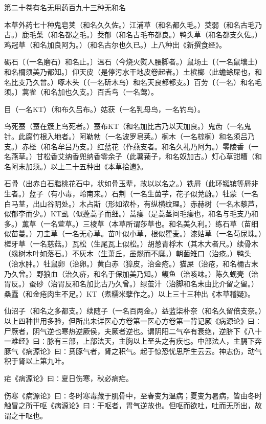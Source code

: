 \documentclass[a4paper,12pt,UTF8,twoside]{ctexbook}
\begin{document}
第二十卷有名无用药百九十三种无和名

本草外药七十种鬼皂荚（和名久久佐。）江浦草（和名都久毛。）茭弱（和名古毛乃古。）鹿毛菜（和名都之毛。）茭郁（和名古毛布都良。）鸭头草（和名都支久佐。）鸡冠草（和名加良阿为。）（和名古尔也久已。）上八种出《新撰食经》。

砺石〔（一名磨石）和名止。〕温石（今烧火熨人腰脚者。）鼠场土〔（一名鼠壤土）和名檷须美乃都知。〕仰天皮（是停污水干地皮卷起者。）土槟榔（此蟾蜍屎也，和名比支乃久曾。）啄木头〔（一名斫木鸟）和名天良都都支。〕百劳〔（一名）和名毛须。〕蒿雀（和名加也久支。）百舌鸟（一名莺）。

目（一名KT）（和布久吕布。）姑获（一名乳母鸟，一名钓鸟）。

鸟死蚕（蚕在簇上鸟死者。）蚕布KT（和名加比古乃以天加良。）鬼齿（一名鬼针。此腐竹根入地者。）阿勒勃（一名波罗皂荚。）榈木（一名棕榈）和名须吕乃支。）赤柽（和名牟吕乃支。）红蓝花（作燕支者。和名久礼乃阿为。）零陵香（一名燕草。）甘松香艾纳香兜纳香零余子（此薯蓣子，和名奴加古。）灯心草甜糟（和名阿末加须。）以上二十五种出《本草拾遗》。

石骨（出赤白石脂桃花石中，状如骨玉辈，故以以名之。）铁屑（此环铤镔等屑非生者。）蓝子（有小毒，岭南来。）石荆（一名生茵芋，花子似茺蔚。）牡蒙（一名白马茎，出山谷阴处。）木占斯（形如浓朴，有纵横纹理。）赤赫树（一名木藜芦，似郁李而少。）KT虱（似蓬蒿子而细。）蒿瘿（是蒿茎间毛瘿也，和名与毛支乃和多。）薰草（一名萱草。）三棱草（本草所谓莎草也。和名美久利。）练石草（苗细似苗蔓。）刀圭草（一名无心草。苗叶似小草，根似瞿麦。）漆姑草（一名苟尿珠。）槎牙草（一名慈菇。）瓦松（生尾瓦上似松。）胡葱青桴木（其木大者尺。）续骨木（缘树木叶如落石。）不灰木（生萧丘，虽燃而不糜。）朝菌雉口（治疮。）鸭头（治水肿。）牡鼠卵（治卵。）黄白赤（獐皮，治金疮。）猫屎（治疮，和名檷古末乃久曾。）野狼血（治久疥，和名于保加美乃知。）鳆鱼（治咳味。）陈久蚬壳（治胃反。）蚕砂（治胃反和名加比古乃久曾。）绿茧汁（治脚和名末由比介留之留。）桑蠹（和金疮肉生不足。）KT（煮糯米孽作之。）以上三十三种出《本草稽疑》。

仙沼子（和名之多都支。）续随子（一名百两金。）益蓝柒朴奈（和名久留倍支奈。）以上四种世用多验，但所出未详医心方卷第一医心方卷第一背记厥《病源论》曰∶尸厥者，阴气逆也寒热逆厥侯，夫厥者逆也。谓阴阳二气卒有衰绝，逆脐下《八十一难经》曰∶脉有三部，上部法天，主胸以上至头之有疾也。中部法人，主膈下奔豚气《病源论》曰∶贲豚气者，肾之积气。起于惊恐忧思所生云云。神志伤，动气积于肾以上第九叶。

疟《病源论》曰∶夏日伤寒，秋必病疟。

伤寒《病源论》曰∶冬时寒毒藏于肌骨中，至春变为温病；夏变为暑病，皆由冬时触冒之所干呕《病源论》曰∶干呕者，胃气逆故也。但呕而欲吐，吐而无所出，故谓之干呕也。
\end{document}
